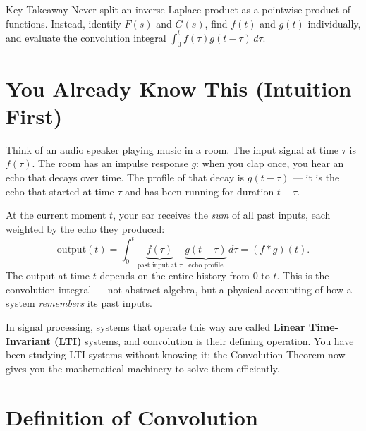 \documentclass[12pt,a4paper]{article}
\begin{document}
\begin{learnbox}{Key Takeaway}
Never split an inverse Laplace product as a pointwise product of functions.
Instead, identify $F(s)$ and $G(s)$, find $f(t)$ and $g(t)$ individually, and
evaluate the convolution integral $\int_0^t f(\tau)g(t-\tau)\,d\tau$.
\end{learnbox}

\section{You Already Know This (Intuition First)}

Think of an audio speaker playing music in a room. The input signal at time
$\tau$ is $f(\tau)$. The room has an impulse response $g$: when you clap once,
you hear an echo that decays over time. The profile of that decay is
$g(t-\tau)$ --- it is the echo that started at time $\tau$ and has been
running for duration $t-\tau$.

At the current moment $t$, your ear receives the \emph{sum} of all past inputs,
each weighted by the echo they produced:
\[
  \text{output}(t)
    = \int_0^t \underbrace{f(\tau)}_{\text{past input at }\tau}
               \;\underbrace{g(t-\tau)}_{\text{echo profile}}\,d\tau
    = (f * g)(t).
\]
The output at time $t$ depends on the entire history from 0 to $t$.
This is the convolution integral --- not abstract algebra, but a physical
accounting of how a system \emph{remembers} its past inputs.

In signal processing, systems that operate this way are called
\textbf{Linear Time-Invariant (LTI)} systems, and convolution is their defining
operation. You have been studying LTI systems without knowing it; the Convolution
Theorem now gives you the mathematical machinery to solve them efficiently.

\section{Definition of Convolution}
\end{document}
